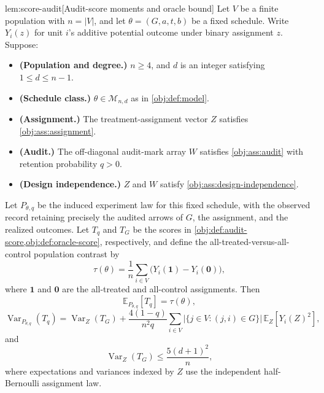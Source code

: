\documentclass[11pt]{article}
\begin{document}
\begin{lemmav}{lem:score-audit}[Audit-score moments and oracle bound]
Let \(V\) be a finite population with \(n=|V|\), and let \(\theta=(G,a,t,b)\) be a fixed schedule. Write \(Y_i(z)\) for unit \(i\)'s additive potential outcome under binary assignment \(z\). Suppose:
\begin{itemize}
\item \textbf{(Population and degree.)} \(n\ge4\), and \(d\) is an integer satisfying \(1\le d\le n-1\).
\item \textbf{(Schedule class.)} \(\theta\in\mathcal M_{n,d}\) as in \cref{obj:def:model}.
\item \textbf{(Assignment.)} The treatment-assignment vector \(Z\) satisfies \cref{obj:ass:assignment}.
\item \textbf{(Audit.)} The off-diagonal audit-mark array \(W\) satisfies \cref{obj:ass:audit} with retention probability \(q>0\).
\item \textbf{(Design independence.)} \(Z\) and \(W\) satisfy \cref{obj:ass:design-independence}.
\end{itemize}
Let \(P_{\theta,q}\) be the induced experiment law for this fixed schedule, with the observed record retaining precisely the audited arrows of \(G\), the assignment, and the realized outcomes. Let \(T_q\) and \(T_G\) be the scores in \cref{obj:def:audit-score,obj:def:oracle-score}, respectively, and define the all-treated-versus-all-control population contrast by
\[
\tau(\theta)
=\frac1n\sum_{i\in V}
\bigl(Y_i(\mathbf1)-Y_i(\mathbf0)\bigr),
\]
where \(\mathbf1\) and \(\mathbf0\) are the all-treated and all-control assignments. Then
\[
\mathbb E_{P_{\theta,q}}[T_q]=\tau(\theta),
\]
\[
\operatorname{Var}_{P_{\theta,q}}(T_q)
=
\operatorname{Var}_{Z}(T_G)
+\frac{4(1-q)}{n^2q}
\sum_{i\in V}
\bigl|\{j\in V:(j,i)\in G\}\bigr|
\,\mathbb E_Z\!\left[Y_i(Z)^2\right],
\]
and
\[
\operatorname{Var}_{Z}(T_G)\le\frac{5(d+1)^2}{n},
\]
where expectations and variances indexed by \(Z\) use the independent half-Bernoulli assignment law.
\end{lemmav}
\end{document}
